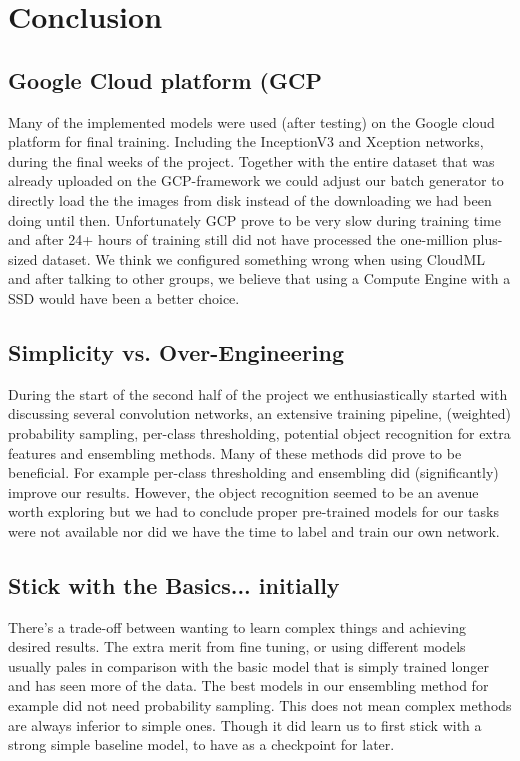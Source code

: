 \documentclass[twocolumn]{article}
\begin{document}
		\section{Conclusion}
		\subsection{Google Cloud platform (GCP}
		Many of the implemented models were used (after testing) on the Google cloud platform for final training. Including the InceptionV3 and Xception networks, during the final weeks of the project. Together with the  entire dataset that was already uploaded on the GCP-framework we could adjust our batch generator to directly load the the images from disk instead of the downloading we had been doing until then. Unfortunately GCP prove to be very slow during training time and after 24+ hours of training still did not have processed the one-million plus-sized dataset. We think we configured something wrong when using CloudML and after talking to other groups, we believe that using a Compute Engine with a SSD would have been a better choice.
		
		\subsection{Simplicity vs. Over-Engineering}
		During the start of the second half of the project we enthusiastically started with discussing several convolution networks, an extensive training pipeline, (weighted) probability sampling, per-class thresholding, potential object recognition for extra features and ensembling methods. Many of these methods did prove to be beneficial. For example per-class thresholding and ensembling did (significantly) improve our results. However, the object recognition seemed to be an avenue worth exploring but we had to conclude proper pre-trained models for our tasks were not available nor did we have the time to label and train our own network. 
		
		\subsection{Stick with the Basics... initially}
        There's a trade-off between wanting to learn complex things and achieving desired results. The extra merit from fine tuning, or using different models usually pales in comparison with the basic model that is simply trained longer and has seen more of the data. The best models in our ensembling method for example did not need probability sampling. This does not mean complex methods are always inferior to simple ones. Though it did learn us to first stick with a strong simple baseline model, to have as a checkpoint for later. 
        
\end{document}
